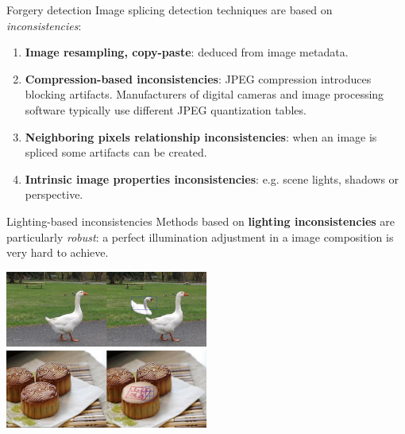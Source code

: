 \begin{tframe}{Forgery detection}
\vspace{0.2cm}
Image splicing detection techniques are based on \textit{inconsistencies}:
\vspace{0.3cm}
\begin{enumerate}
\item \textbf{Image resampling, copy-paste}: deduced from image metadata.
\vspace{0.3cm}

\item \textbf{Compression-based inconsistencies}: JPEG compression introduces blocking artifacts. Manufacturers of digital cameras and image processing software typically use different JPEG quantization tables.
\vspace{0.3cm}

\item  \textbf{Neighboring pixels relationship inconsistencies}: when an image is spliced some artifacts can be created.
\vspace{0.3cm}
\item \textbf{Intrinsic image properties inconsistencies}: e.g. scene lights, shadows or perspective.
\end{enumerate}

\end{tframe}


\begin{tframe}{Lighting-based inconsistencies}
\vspace{0.2cm}
Methods based on \textbf{lighting inconsistencies} are particularly \emph{robust}: a perfect illumination adjustment in a image composition is very hard to achieve.
\vspace{0.3cm}
\begin{center}
\includegraphics[width=0.5\textwidth]{images/ducks.jpg}
\vspace{0.1cm}
\includegraphics[width=0.5\textwidth]{images/cakes.jpg}
\end{center}
\end{tframe}

